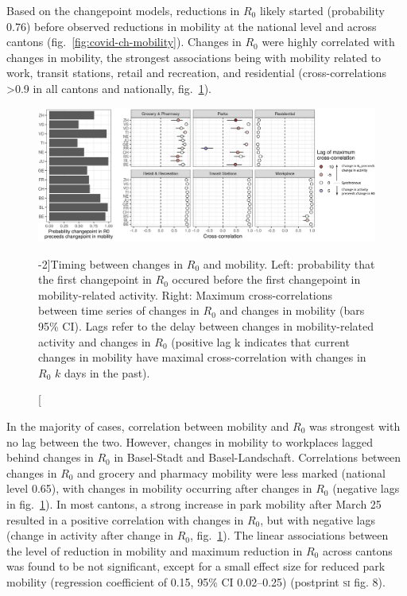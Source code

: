 Based on the changepoint models, reductions in $R_0$ likely started (probability 0.76) before observed reductions in mobility at the national level and across cantons (fig.~\ref{fig:covid-ch-mobility}). Changes in $R_0$ were highly correlated with changes in mobility, the strongest associations being with mobility related to work, transit stations, retail and recreation, and residential (cross-correlations >0.9 in all cantons and nationally, fig.~\ref{fig:covid-ch-timing}). 
\begin{figure}\centering
  \includegraphics[width=\textwidth]{fig_covid-switzerland-npi/FIGURE_4.png}
  \caption[Timing between changes in $R_0$ and mobility][-2\baselineskip]{Timing between changes in $R_0$ and mobility. Left: probability that the first changepoint in $R_0$ occured before the first changepoint in mobility-related activity. Right: Maximum cross-correlations between time series of changes in $R_0$ and changes in mobility (bars 95\% CI). Lags refer to the delay between changes in mobility-related activity and changes in $R_0$ (positive lag k indicates that current changes in mobility have maximal cross-correlation with changes in $R_0$ $k$ days in the past).}
  \label{fig:covid-ch-timing}
\end{figure}
In the majority of cases, correlation between mobility and $R_0$ was strongest with no lag between the two. However, changes in mobility to workplaces lagged behind changes in $R_0$ in Basel-Stadt and Basel-Landschaft. Correlations between changes in $R_0$ and grocery and pharmacy mobility were less marked (national level 0.65), with changes in mobility occurring after changes in $R_0$ (negative lags in fig.~\ref{fig:covid-ch-timing}). In most cantons, a strong increase in park mobility after March 25 resulted in a positive correlation with changes in $R_0$, but with negative lags (change in activity after change in $R_0$, fig.~\ref{fig:covid-ch-timing}). 
The linear associations between the level of reduction in mobility and maximum reduction in $R_0$ across cantons was found to be not significant, except for a small effect size for reduced park mobility (regression coefficient of 0.15, 95\% CI 0.02–0.25) (postprint \textsc{si} fig. 8). 

